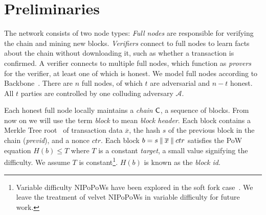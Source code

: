 \section{Preliminaries}\label{sec:preliminaries}

The network consists of two
node types: \emph{Full nodes} are responsible for
verifying the chain and mining new blocks. \emph{Verifiers} connect to full nodes to learn facts
about the chain without downloading it, such as whether a
transaction is confirmed. A verifier connects to multiple full nodes, which function as \emph{provers} for the verifier, at
least one of which is honest.
We model full nodes according to Backbone~\cite{backbone}. There are
$n$ full nodes, of which $t$ are adversarial and $n - t$ honest. All $t$
parties are controlled by one colluding adversary $\mathcal{A}$.

Each honest full node locally maintains a \emph{chain} $\mathsf{C}$, a sequence of
blocks. From now on we will
use the term \emph{block} to mean
\emph{block header}. Each block contains a Merkle Tree root~\cite{merkle} of
transaction data
$\overline{x}$, the hash $s$ of the previous block in the chain
(\emph{previd}), and a nonce $ctr$. Each block $b = s \mathbin{\|}
\overline{x} \mathbin{\|} ctr$ satisfies the PoW~\cite{pow} equation $H(b) \leq T$
where $T$ is a constant \emph{target}, a small value signifying the difficulty. We assume $T$ is constant\footnote{Variable difficulty NIPoPoWs have been explored in the soft fork
case~\cite{dionyziz}. We leave the treatment of velvet NIPoPoWs in
variable difficulty for future work.}. $H(b)$ is
known as the \emph{block id}.

